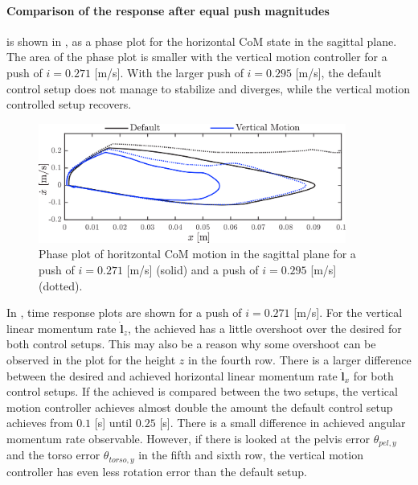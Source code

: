 \paragraph{Comparison of the response after equal push magnitudes} is shown in , as a phase plot for the horizontal \ac{CoM} state in the sagittal plane. The area of the phase plot is smaller with the vertical motion controller for a push of $i=0.271$ [m/s]. With the larger push of $i=0.295$ [m/s], the default control setup does not manage to stabilize and diverges, while the vertical motion controlled setup recovers.
\begin{figure}
\centering
\includegraphics[width=0.9\textwidth]{STYLESTUFF/valcomparephase.png}
\caption{Phase plot of horitzontal \ac{CoM} motion in the sagittal plane for a push of $i=0.271$ [m/s] (solid) and a push of $i=0.295$ [m/s] (dotted).}
\label{fig:valcomparephase}
\end{figure}

In , time response plots are shown for a push of $i=0.271$ [m/s]. For the vertical linear momentum rate $\dot{\mathbf{l}}_z$, the achieved has a little overshoot over the desired for both control setups. This may also be a reason why some overshoot can be observed in the plot for the height $z$ in the fourth row. There is a larger difference between the desired and achieved horizontal linear momentum rate $\dot{\mathbf{l}}_x$ for both control setups. If the achieved is compared between the two setups, the vertical motion controller achieves almost double the amount the default control setup achieves from $0.1$ [s] until $0.25$ [s]. There is a small difference in achieved angular momentum rate observable. However, if there is looked at the pelvis error $\theta_{pel,y}$ and the torso error $\theta_{torso,y}$ in the fifth and sixth row, the vertical motion controller has even less rotation error than the default setup. 

